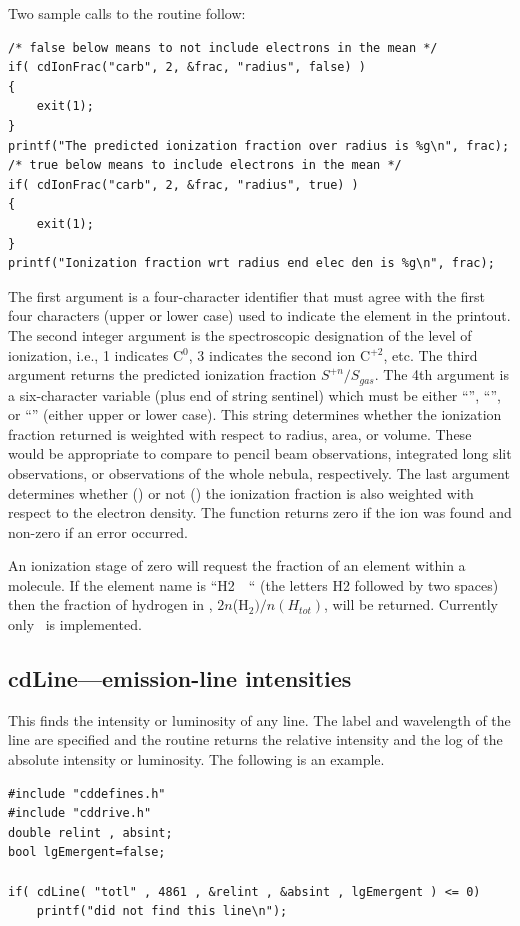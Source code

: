 Two sample calls to the routine follow:
\begin{verbatim}
/* false below means to not include electrons in the mean */
if( cdIonFrac("carb", 2, &frac, "radius", false) )
{
    exit(1);
}
printf("The predicted ionization fraction over radius is %g\n", frac);
/* true below means to include electrons in the mean */
if( cdIonFrac("carb", 2, &frac, "radius", true) )
{
    exit(1);
}
printf("Ionization fraction wrt radius end elec den is %g\n", frac);
\end{verbatim}
The first argument is a four-character identifier that must agree with the
first four characters (upper or lower case) used to indicate the element
in the printout.  The second integer argument is the spectroscopic
designation of the level of ionization, i.e., 1 indicates C$^0$,
3 indicates the second ion C$^{+2}$, etc.
The third argument returns the predicted ionization
fraction $S^{+n}/S_{gas}$.
The 4th argument is a six-character variable (plus end
of string sentinel) which must be either ``'', ``'', or
``'' (either
upper or lower case).
This string determines whether the ionization fraction
returned is weighted with respect to radius, area, or volume.
These would be appropriate to compare to pencil beam observations,
integrated long slit observations, or observations of the whole nebula, respectively.
The last argument
determines whether () or not ()
the ionization fraction is also
weighted with respect to the electron density.
The function returns zero
if the ion was found and non-zero if an error occurred.

An ionization stage of zero will request the fraction of an element
within a molecule.
If the element name is ``H2~~`` (the letters H2 followed
by two spaces) then the fraction of hydrogen in \htwo,
$2n$(H$_2)/n(H_{tot})$, will
be returned.  Currently only \htwo\ is implemented.

\subsection{cdLine---emission-line intensities }

This finds the intensity or luminosity of any line.  The label and
wavelength of the line are specified and the routine returns the relative
intensity and the log of the absolute intensity or luminosity.
The following is an example.
\begin{verbatim}
#include "cddefines.h"
#include "cddrive.h"
double relint , absint;
bool lgEmergent=false;

if( cdLine( "totl" , 4861 , &relint , &absint , lgEmergent ) <= 0)
    printf("did not find this line\n");
\end{verbatim}


